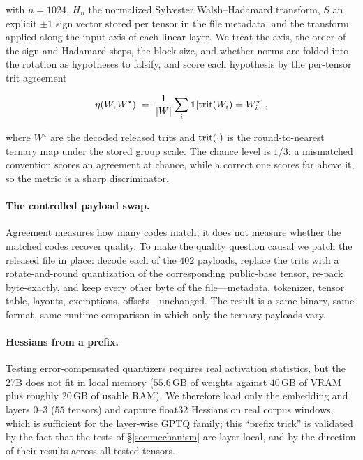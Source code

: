 \noindent with $n=1024$, $H_n$ the normalized Sylvester Walsh--Hadamard
transform, $S$ an explicit $\pm 1$ sign vector stored per tensor in the file
metadata, and the transform applied along the input axis of each linear layer.
We treat the axis, the order of the sign and Hadamard steps, the block size, and
whether norms are folded into the rotation as hypotheses to falsify, and score
each hypothesis by the per-tensor trit agreement

\begin{equation}
  \eta(W, W^{\star}) \;=\; \frac{1}{|W|}\sum_i \mathbf{1}\!\left[\mathrm{trit}(W_i) = W_i^{\star}\right],
  \label{eq:agreement}
\end{equation}

\noindent where $W^{\star}$ are the decoded released trits and $\mathrm{trit}(\cdot)$
is the round-to-nearest ternary map under the stored group scale. The chance
level is $1/3$: a mismatched convention scores an agreement at chance, while a
correct one scores far above it, so the metric is a sharp discriminator.

\paragraph{The controlled payload swap.}
Agreement measures how many codes match; it does not measure whether the matched
codes recover quality. To make the quality question causal we patch the released
file in place: decode each of the $402$ payloads, replace the trits with a
rotate-and-round quantization of the corresponding public-base tensor, re-pack
byte-exactly, and keep every other byte of the file---metadata, tokenizer,
tensor table, layouts, exemptions, offsets---unchanged. The result is a
same-binary, same-format, same-runtime comparison in which only the ternary
payloads vary.

\paragraph{Hessians from a prefix.}
Testing error-compensated quantizers requires real activation statistics, but
the 27B does not fit in local memory ($55.6$\,GB of weights against $40$\,GB of
VRAM plus roughly $20$\,GB of usable RAM). We therefore load only the embedding
and layers $0$--$3$ ($55$ tensors) and capture float32 Hessians on real corpus
windows, which is sufficient for the layer-wise GPTQ family; this ``prefix
trick'' is validated by the fact that the tests of
\S\ref{sec:mechanism} are layer-local, and by the direction of their results
across all tested tensors.

